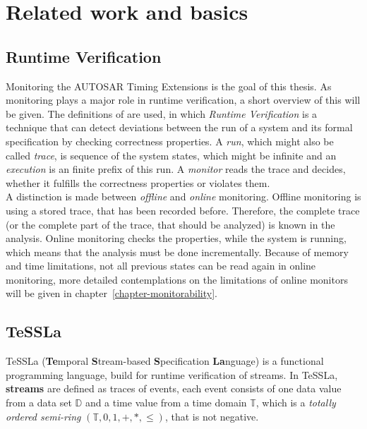 
\chapter{Related work and basics}
\label{chapter-Related-Work}

\section{Runtime Verification}
	Monitoring the AUTOSAR Timing Extensions is the goal of this thesis. As monitoring plays a major role in runtime verification, a short overview of this will be given. The definitions of \cite{RuntimeVerification} are used, in which \emph{Runtime Verification} is a technique that can detect deviations between the run of a system and its formal specification by checking correctness properties. A \emph{run}, which might also be called \emph{trace}, is sequence of the system states, which might be infinite and an \emph{execution} is an finite prefix of this run. A \emph{monitor} reads the trace and decides, whether it fulfills the correctness properties or violates them.\\
	A distinction is made between \emph{offline} and \emph{online} monitoring. Offline monitoring is using a stored trace, that has been recorded before. Therefore, the complete trace (or the complete part of the trace, that should be analyzed) is known in the analysis. Online monitoring checks the properties, while the system is running, which means that the analysis must be done incrementally. Because of memory and time limitations, not all previous states can be read again in online monitoring, more detailed contemplations on the limitations of online monitors will be given in chapter~\ref{chapter-monitorability}.


\section{TeSSLa}

	TeSSLa (\textbf{Te}mporal \textbf{S}tream-based \textbf{S}pecification \textbf{La}nguage) is a functional programming language, build for runtime verification of streams. In TeSSLa, \textbf{streams} are defined as traces of events, each event consists of one data value from a data set $\mathbb D$ and a time value from a time domain $\mathbb T$, which is a \emph{totally ordered semi-ring} $(\mathbb{T}, 0, 1, +, *, \leq)$, that is not negative.


